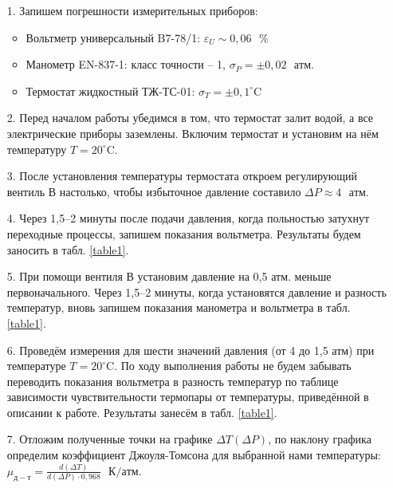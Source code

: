 \documentclass[a4paper, 12pt]{article}
\begin{document}
    \begin{enumerate}
        
        \item[1.] Запишем погрешности измерительных приборов:
            \begin{itemize}
                \item Вольтметр универсальный B7-78/1: $\varepsilon_U \sim 0,06 \text{ } \%$
                \item Манометр EN-837-1: класс точности – 1, $\sigma_P = \pm 0,02 \text{ } атм.$
                \item Термостат жидкостный ТЖ-ТС-01: $\sigma_T = \pm 0,1^{\circ}\text{C}$
            \end{itemize}
        
        \item[2.] Перед началом работы убедимся в том, что термостат залит водой, а все электрические приборы заземлены. Включим термостат и установим на нём температуру $T = 20^{\circ}\text{C}$.
        
        \item[3.] После установления температуры термостата откроем регулирующий вентиль В настолько, чтобы избыточное давление составило $\Delta P \approx 4 \text{ } атм$.
        
        \item[4.] Через 1,5–2 минуты после подачи давления, когда польностью затухнут переходные процессы, запишем показания вольтметра. Результаты будем заносить в табл. \ref{table1}.
        
        \item[5.] При помощи вентиля В установим давление на 0,5 атм. меньше первоначального. Через 1,5–2 минуты, когда установятся давление и разность температур, вновь запишем показания манометра и вольтметра в табл. \ref{table1}.
        
        \item[6.] Проведём измерения для шести значений давления (от 4 до 1,5 атм) при температуре $T = 20^{\circ}\text{C}$. По ходу выполнения работы не будем забывать переводить показания вольтметра в разность температур по таблице зависимости чувствительности термопары от температуры, приведённой в описании к работе. Результаты занесём в табл. \ref{table1}.
        
        \item[7.] Отложим полученные точки на графике $\Delta T (\Delta P)$, по наклону графика определим коэффициент Джоуля-Томсона для выбранной нами температуры: $\mu_{д-т} = \frac{d(\Delta T)}{d(\Delta P) \cdot 0,968} \text{ } К/атм$.
        

\end{enumerate}
\end{document}
